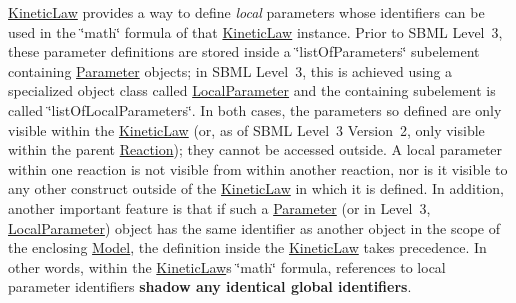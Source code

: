 \hyperlink{class_kinetic_law}{Kinetic\+Law} provides a way to define {\itshape local} parameters whose identifiers can be used in the \char`\"{}math\char`\"{} formula of that \hyperlink{class_kinetic_law}{Kinetic\+Law} instance. Prior to S\+B\+ML Level~3, these parameter definitions are stored inside a \char`\"{}list\+Of\+Parameters\char`\"{} subelement containing \hyperlink{class_parameter}{Parameter} objects; in S\+B\+ML Level~3, this is achieved using a specialized object class called \hyperlink{class_local_parameter}{Local\+Parameter} and the containing subelement is called \char`\"{}list\+Of\+Local\+Parameters\char`\"{}. In both cases, the parameters so defined are only visible within the \hyperlink{class_kinetic_law}{Kinetic\+Law} (or, as of S\+B\+ML Level~3 Version~2, only visible within the parent \hyperlink{class_reaction}{Reaction}); they cannot be accessed outside. A local parameter within one reaction is not visible from within another reaction, nor is it visible to any other construct outside of the \hyperlink{class_kinetic_law}{Kinetic\+Law} in which it is defined. In addition, another important feature is that if such a \hyperlink{class_parameter}{Parameter} (or in Level~3, \hyperlink{class_local_parameter}{Local\+Parameter}) object has the same identifier as another object in the scope of the enclosing \hyperlink{class_model}{Model}, the definition inside the \hyperlink{class_kinetic_law}{Kinetic\+Law} takes precedence. In other words, within the \hyperlink{class_kinetic_law}{Kinetic\+Law}\textquotesingle{}s \char`\"{}math\char`\"{} formula, references to local parameter identifiers {\bfseries shadow any identical global identifiers}.

